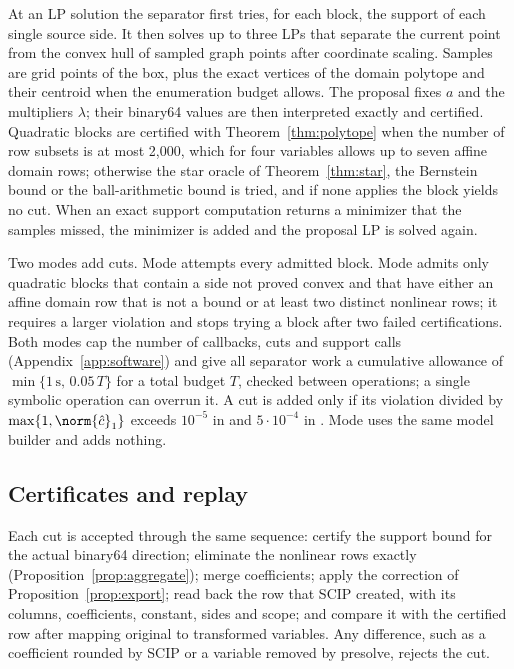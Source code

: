 At an LP solution the separator first tries, for each block, the support
of each single source side. It then solves up to three LPs that separate
the current point from the convex hull of sampled graph points after
coordinate scaling. Samples are grid points of the box, plus the exact
vertices of the domain polytope and their centroid when the enumeration
budget allows. The proposal fixes $a$ and the multipliers $\lambda$; their
binary64 values are then interpreted exactly and certified. Quadratic
blocks are certified with Theorem~\ref{thm:polytope} when the number of row
subsets is at most 2{,}000, which for four variables allows up to seven
affine domain rows; otherwise the star oracle of Theorem~\ref{thm:star},
the Bernstein bound or the ball-arithmetic bound is tried, and if none
applies the block yields no cut. When an exact support computation returns
a minimizer that the samples missed, the minimizer is added and the
proposal LP is solved again.

Two modes add cuts. Mode  attempts every admitted block. Mode
 admits only quadratic blocks that contain a side not proved
convex and that have either an affine domain row that is not a bound or
at least two distinct nonlinear rows; it requires a larger violation and
stops trying a block after two failed certifications. Both modes cap the
number of callbacks, cuts and support calls (Appendix~\ref{app:software})
and give all separator work a cumulative allowance of
$\min\{1\,\mathrm s,\,0.05\,T\}$ for a total budget $T$, checked between
operations; a single symbolic operation can overrun it. A cut is added only
if its violation divided by $\max\{1,\norm{\hat c}_1\}$ exceeds $10^{-5}$ in
 and $5\cdot10^{-4}$ in . Mode  uses the
same model builder and adds nothing.

\subsection{Certificates and replay}\label{sec:replay}

Each cut is accepted through the same sequence: certify the support bound
for the actual binary64 direction; eliminate the nonlinear rows exactly
(Proposition~\ref{prop:aggregate}); merge coefficients; apply the
correction of Proposition~\ref{prop:export}; read back the row that SCIP
created, with its columns, coefficients, constant, sides and scope; and
compare it with the certified row after mapping original to transformed
variables. Any difference, such as a coefficient rounded by SCIP or a
variable removed by presolve, rejects the cut.

